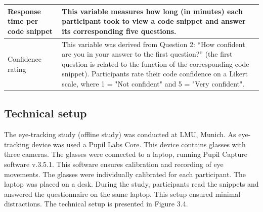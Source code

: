 \begin{longtable}{|p{5.5cm}|p{8.5cm}|}
\parbox[t]{5.5cm}{\vspace{0.3em}Response time per code snippet\vspace{0.5em}} &
\parbox[t]{8.5cm}{\vspace{0.3em}This variable measures how long (in minutes) each participant took to view a code snippet and answer its corresponding five questions.\vspace{0.5em}} \\
\hline

\parbox[t]{5.5cm}{\vspace{0.3em}Confidence rating\vspace{0.5em}} &
\parbox[t]{8.5cm}{\vspace{0.3em}This variable was derived from Question 2: “How confident are you in your answer to the first question?” (the first question is related to the function of the corresponding code snippet). Participants rate their code confidence on a Likert scale, where 1 = "Not confident" and 5 = "Very confident".\vspace{0.5em}} \\
\hline

\end{longtable}


\subsection{Technical setup}


The eye-tracking study (offline study) was conducted at LMU, Munich. As eye-tracking device was used a Pupil Labs Core. This device contains glasses with three cameras. The glasses were connected to a laptop, running Pupil Capture software v.3.5.1. This software ensures calibration and recording of eye movements. The glasses were individually calibrated for each participant. The laptop was placed on a desk. During the study, participants read the snippets and answered the questionnaire on the same laptop. This setup ensured minimal distractions. The technical setup is presented in Figure 3.4. 

